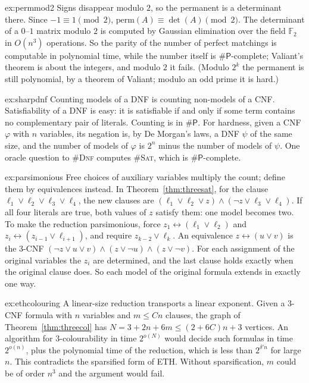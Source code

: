 \begin{solution}{ex:permmod2}
\idea Signs disappear modulo $2$, so the permanent is a determinant there.
\writeup Since $-1\equiv1\pmod2$, $\mathrm{perm}(A)\equiv\det(A)\pmod2$. The determinant of a $0$--$1$ matrix modulo $2$ is computed by Gaussian elimination over the field $\mathbb F_2$ in $O(n^3)$ operations. So the parity of the number of perfect matchings is computable in polynomial time, while the number itself is $\#\mathsf P$-complete; Valiant's theorem is about the integers, and modulo $2$ it fails. (Modulo $2^k$ the permanent is still polynomial, by a theorem of Valiant; modulo an odd prime it is hard.)
\end{solution}

\begin{solution}{ex:sharpdnf}
\idea Counting models of a DNF is counting non-models of a CNF.
\writeup Satisfiability of a DNF is easy: it is satisfiable if and only if some term contains no complementary pair of literals. Counting is in $\#\mathsf P$. For hardness, given a CNF $\varphi$ with $n$ variables, its negation is, by De Morgan's laws, a DNF $\psi$ of the same size, and the number of models of $\varphi$ is $2^n$ minus the number of models of $\psi$. One oracle question to \#\textup{\textsc{Dnf}} computes \#\textup{\textsc{Sat}}, which is $\#\mathsf P$-complete.
\end{solution}

\begin{solution}{ex:parsimonious}
\idea Free choices of auxiliary variables multiply the count; define them by equivalences instead.
\writeup In Theorem~\ref{thm:threesat}, for the clause $\ell_1\lor\ell_2\lor\ell_3\lor\ell_4$, the new clauses are $(\ell_1\lor\ell_2\lor z)\land(\neg z\lor\ell_3\lor\ell_4)$. If all four literals are true, both values of $z$ satisfy them: one model becomes two. To make the reduction parsimonious, force $z_1\leftrightarrow(\ell_1\lor\ell_2)$ and $z_{i}\leftrightarrow(z_{i-1}\lor\ell_{i+1})$, and require $z_{k-2}\lor\ell_k$. An equivalence $z\leftrightarrow(u\lor v)$ is the 3-CNF $(\neg z\lor u\lor v)\land(z\lor\neg u)\land(z\lor\neg v)$. For each assignment of the original variables the $z_i$ are determined, and the last clause holds exactly when the original clause does. So each model of the original formula extends in exactly one way.
\end{solution}

\begin{solution}{ex:ethcolouring}
\idea A linear-size reduction transports a linear exponent.
\writeup Given a 3-CNF formula with $n$ variables and $m\le Cn$ clauses, the graph of Theorem~\ref{thm:threecol} has $N=3+2n+6m\le(2+6C)n+3$ vertices. An algorithm for $3$-colourability in time $2^{o(N)}$ would decide such formulas in time $2^{o(n)}$, plus the polynomial time of the reduction, which is less than $2^{\delta'n}$ for large $n$. This contradicts the sparsified form of ETH. Without sparsification, $m$ could be of order $n^3$ and the argument would fail.
\end{solution}

